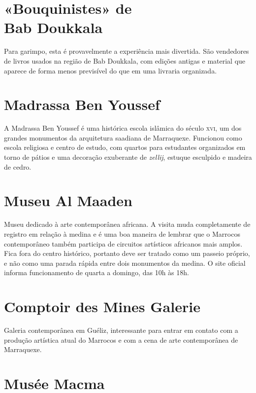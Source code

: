 \chapter*{«Bouquinistes» de\\ Bab Doukkala}

Para garimpo, esta é provavelmente a experiência mais divertida. São vendedores de livros usados na região de Bab Doukkala, com edições antigas e material que aparece de forma menos previsível do que em uma livraria organizada.

\chapter{Madrassa Ben Youssef}

A Madrassa Ben Youssef é uma histórica escola islâmica do século \textsc{xvi}, um dos grandes monumentos da arquitetura saadiana de Marraquexe. Funcionou como escola religiosa e centro de estudo, com quartos para estudantes organizados em torno de pátios e uma decoração exuberante de \textit{zellij}, estuque esculpido e madeira de cedro.

\chapter{Museu Al Maaden}

Museu dedicado à arte contemporânea africana. A visita muda completamente de registro em relação à medina e é uma boa maneira de lembrar que o Marrocos contemporâneo também participa de circuitos artísticos africanos mais amplos. Fica fora do centro histórico, portanto deve ser tratado como um passeio próprio, e não como uma parada rápida entre dois monumentos da medina. O site oficial informa funcionamento de quarta a domingo, das 10h às 18h.

\chapter{Comptoir des Mines Galerie}

Galeria contemporânea em Guéliz, interessante para entrar em contato com a produção artística atual do Marrocos e com a cena de arte contemporânea de Marraquexe.

\chapter{Musée Macma}

